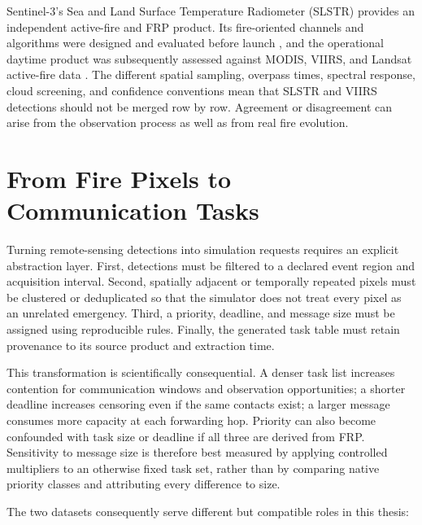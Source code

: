 Sentinel-3's Sea and Land Surface Temperature Radiometer (SLSTR) provides an independent active-fire and FRP product. Its fire-oriented channels and algorithms were designed and evaluated before launch \citep{WoosterSLSTR2012}, and the operational daytime product was subsequently assessed against MODIS, VIIRS, and Landsat active-fire data \citep{XuWooster2023}. The different spatial sampling, overpass times, spectral response, cloud screening, and confidence conventions mean that SLSTR and VIIRS detections should not be merged row by row. Agreement or disagreement can arise from the observation process as well as from real fire evolution.

\section{From Fire Pixels to Communication Tasks}

Turning remote-sensing detections into simulation requests requires an explicit abstraction layer. First, detections must be filtered to a declared event region and acquisition interval. Second, spatially adjacent or temporally repeated pixels must be clustered or deduplicated so that the simulator does not treat every pixel as an unrelated emergency. Third, a priority, deadline, and message size must be assigned using reproducible rules. Finally, the generated task table must retain provenance to its source product and extraction time.

This transformation is scientifically consequential. A denser task list increases contention for communication windows and observation opportunities; a shorter deadline increases censoring even if the same contacts exist; a larger message consumes more capacity at each forwarding hop. Priority can also become confounded with task size or deadline if all three are derived from FRP. Sensitivity to message size is therefore best measured by applying controlled multipliers to an otherwise fixed task set, rather than by comparing native priority classes and attributing every difference to size.

The two datasets consequently serve different but compatible roles in this thesis:

